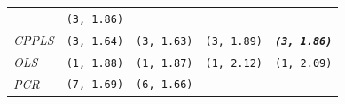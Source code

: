 \documentclass[12pt,A4paper,authoryear]{elsarticle} %
\theoremstyle{definition}
\theoremstyle{definition}
\theoremstyle{remark}
\begin{document}
\begin{longtable}[]{@{}lcccc@{}}
\begin{minipage}[t]{0.19\columnwidth}
\end{minipage} & \begin{minipage}[t]{0.19\columnwidth}\centering\strut
\texttt{(3,\ 1.86)}\strut
\end{minipage}\tabularnewline
\begin{minipage}[t]{0.09\columnwidth}\raggedright\strut
\emph{CPPLS}\strut
\end{minipage} & \begin{minipage}[t]{0.19\columnwidth}\centering\strut
\texttt{(3,\ 1.64)}\strut
\end{minipage} & \begin{minipage}[t]{0.19\columnwidth}\centering\strut
\texttt{(3,\ 1.63)}\strut
\end{minipage} & \begin{minipage}[t]{0.19\columnwidth}\centering\strut
\texttt{(3,\ 1.89)}\strut
\end{minipage} & \begin{minipage}[t]{0.19\columnwidth}\centering\strut
\textbf{\emph{\texttt{(3,\ 1.86)}}}\strut
\end{minipage}\tabularnewline
\begin{minipage}[t]{0.09\columnwidth}\raggedright\strut
\emph{OLS}\strut
\end{minipage} & \begin{minipage}[t]{0.19\columnwidth}\centering\strut
\texttt{(1,\ 1.88)}\strut
\end{minipage} & \begin{minipage}[t]{0.19\columnwidth}\centering\strut
\texttt{(1,\ 1.87)}\strut
\end{minipage} & \begin{minipage}[t]{0.19\columnwidth}\centering\strut
\texttt{(1,\ 2.12)}\strut
\end{minipage} & \begin{minipage}[t]{0.19\columnwidth}\centering\strut
\texttt{(1,\ 2.09)}\strut
\end{minipage}\tabularnewline
\begin{minipage}[t]{0.09\columnwidth}\raggedright\strut
\emph{PCR}\strut
\end{minipage} & \begin{minipage}[t]{0.19\columnwidth}\centering\strut
\texttt{(7,\ 1.69)}\strut
\end{minipage} & \begin{minipage}[t]{0.19\columnwidth}\centering\strut
\texttt{(6,\ 1.66)}\strut
\end{minipage} & \begin{minipage}[t]{0.19\columnwidth}\centering\strut

\end{minipage}
\end{longtable}
\end{document}
